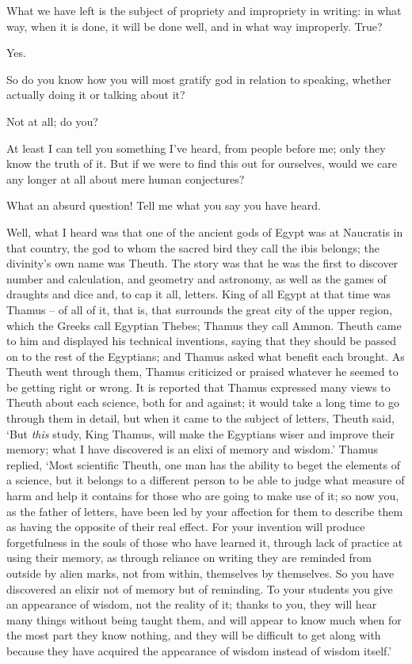 What we have left is the subject of propriety and impropriety
in writing: in what way, when it is done, it will be done well, and in what 
way improperly. True?

Yes.

So do you know how you will most gratify god in relation to
speaking, whether actually doing it or talking about  it?

Not at all; do you?

At least I can tell you something I've heard, from 
people before me; only they know the truth of it. But if we were to find
this out for ourselves, would we care any longer at all about mere human
conjectures?

What an absurd question! Tell me what you say you have heard.

Well, what I heard was that one of the ancient gods  of
Egypt was at Naucratis in that country, the god to whom the sacred bird
they call the ibis belongs; the divinity's own name was Theuth. The
story was that he was the first to discover number and calculation, and
geometry and astronomy, as well  as the games of draughts and
dice and, to cap it all, letters. King of all Egypt at that time was
Thamus -- of all of it, that is, that surrounds the great city of the
upper region, which the  Greeks call Egyptian Thebes; Thamus
they call Ammon. Theuth came to him and displayed his technical
inventions, saying that they should be passed on to the rest of the
Egyptians; and Thamus asked what benefit each brought. As Theuth went
 through them, Thamus criticized or praised whatever he seemed
to be getting right or wrong. It is reported that Thamus expressed many
views to Theuth about each science, both for and against; it would take
a long time to go through them in detail, but when it came to the
subject of letters, Theuth said,  ‘But {\em this} study, King
Thamus, will make the Egyptians wiser and improve their memory; what I
have discovered is an
elixi of memory and
wisdom.' Thamus replied, ‘Most scientific Theuth, one man has the
ability to beget the elements of a science, but it belongs to a
different person to be able to judge what measure of harm and help it
contains for those who are  going to make use of it; so now
you, as the father of letters, have been led by your affection for them
to describe them as having the opposite of their real effect. For your
invention will produce forgetfulness in the souls of those who have
learned it, through lack of practice at using their memory, as through
reliance on writing they are reminded from outside by alien 
marks, not from within, themselves by
themselves. So you have
discovered an elixir not of memory but of reminding. To your students
you give an appearance of wisdom, not the reality of it; thanks to you,
they will hear many things without being  taught them, and will
appear to know much when for the most part they know nothing, and they
will be difficult to get along with because they have acquired the
appearance of wisdom instead of wisdom itself.'

